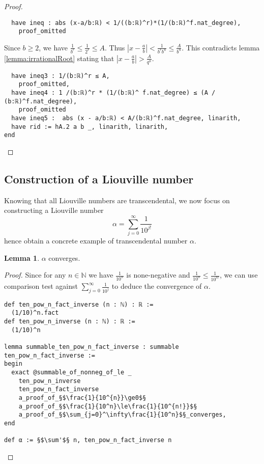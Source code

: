 \documentclass{report}
\theoremstyle{definition}
\newtheorem{lemma}{Lemma}[section]
\theoremstyle{plain}
\begin{document}
\begin{proof}
\begin{verbatim}
  have ineq : abs (x-a/b:ℝ) < 1/((b:ℝ)^r)*(1/(b:ℝ)^f.nat_degree),
    proof_omitted
\end{verbatim}

Since $b\ge 2$, we have $\frac1{b^r}\le\frac1{2^r}\le A$. Thus $\left|x-\frac a b\right|<\frac1{b^r b^n}\le \frac A{b^n}$. This contradicts lemma \ref{lemma:irrationalRoot} stating that $\left|x-\frac a b\right|>\frac{A}{q^n}$.
\begin{verbatim} 
  have ineq3 : 1/(b:ℝ)^r ≤ A,
    proof_omitted,
  have ineq4 : 1 /(b:ℝ)^r * (1/(b:ℝ)^ f.nat_degree) ≤ (A / (b:ℝ)^f.nat_degree),
    proof_omitted
  have ineq5 :  abs (x - a/b:ℝ) < A/(b:ℝ)^f.nat_degree, linarith,
  have rid := hA.2 a b _, linarith, linarith,
end
\end{verbatim}
\end{proof}

\subsection*{Construction of a Liouville number}

Knowing that all Liouville numbers are transcendental, we now focus on constructing a Liouville number $$\alpha=\sum_{j=0}^\infty \frac1{10^{j!}}$$hence obtain a concrete example of transcendental number $\alpha$.

\begin{lemma}
$\alpha$ converges.
\end{lemma}

\begin{proof}
Since for any $n\in\mathbb N$ we have $\frac 1{10^{n}}$ is none-negative and $\frac1{10^n}\le\frac1{10^{n!}}$, we can use comparison test against $\sum_{j=0}^\infty\frac1{10^j}$ to deduce the convergence of $\alpha$.

\begin{verbatim}
def ten_pow_n_fact_inverse (n : ℕ) : ℝ := 
  (1/10)^n.fact
def ten_pow_n_inverse (n : ℕ) : ℝ := 
  (1/10)^n

lemma summable_ten_pow_n_fact_inverse : summable ten_pow_n_fact_inverse :=
begin
  exact @summable_of_nonneg_of_le _ 
    ten_pow_n_inverse 
    ten_pow_n_fact_inverse 
    a_proof_of_§$\frac{1}{10^{n}}\ge0$§
    a_proof_of_§$\frac{1}{10^n}\le\frac{1}{10^{n!}}$§
    a_proof_of_§$\sum_{j=0}^\infty\frac{1}{10^n}$§_converges,
end

def α := §$\sum'$§ n, ten_pow_n_fact_inverse n
\end{verbatim}
\end{proof}
\end{document}

